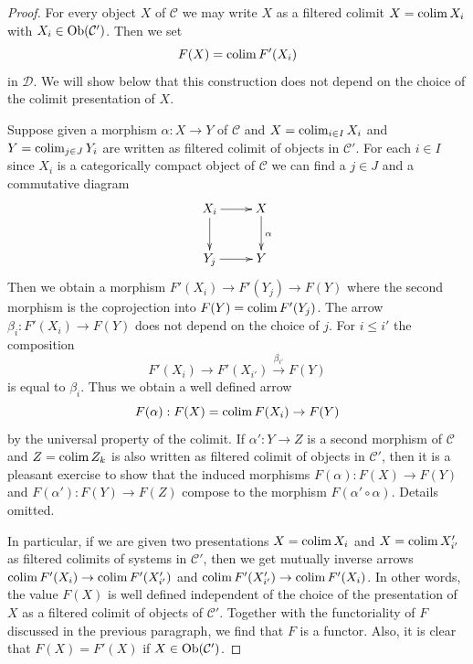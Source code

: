 \begin{proof}
For every object $X$ of $\mathcal{C}$ we may write $X$ as a filtered
colimit $X = \mathop{\mathrm{colim}}\nolimits X_i$ with $X_i \in \mathop{\mathrm{Ob}}\nolimits(\mathcal{C}')$. Then we set
$$
F(X) = \mathop{\mathrm{colim}}\nolimits F'(X_i)
$$
in $\mathcal{D}$. We will show below that this construction does not
depend on the choice of the colimit presentation of $X$.

\medskip\noindent
Suppose given a morphism $\alpha : X \to Y$ of $\mathcal{C}$
and $X = \mathop{\mathrm{colim}}\nolimits_{i \in I} X_i$ and $Y = \mathop{\mathrm{colim}}\nolimits_{j \in J} Y_i$
are written as filtered colimit of objects in $\mathcal{C}'$.
For each $i \in I$ since $X_i$ is a categorically compact object of
$\mathcal{C}$ we can find a $j \in J$ and a commutative diagram
$$
\xymatrix{
X_i \ar[r] \ar[d] & X \ar[d]^\alpha \\
Y_j \ar[r] & Y
}
$$
Then we obtain a morphism $F'(X_i) \to F'(Y_j) \to F(Y)$ where the second
morphism is the coprojection into $F(Y) = \mathop{\mathrm{colim}}\nolimits F'(Y_j)$. The arrow
$\beta_i : F'(X_i) \to F(Y)$ does not depend on the choice of $j$.
For $i \leq i'$ the composition
$$
F'(X_i) \to F'(X_{i'}) \xrightarrow{\beta_{i'}} F(Y)
$$
is equal to $\beta_i$. Thus we obtain a well defined arrow
$$
F(\alpha) : F(X) = \mathop{\mathrm{colim}}\nolimits F(X_i) \to F(Y)
$$
by the universal property of the colimit. If $\alpha' : Y \to Z$ is a
second morphism of $\mathcal{C}$ and $Z = \mathop{\mathrm{colim}}\nolimits Z_k$ is also
written as filtered colimit of objects in $\mathcal{C}'$, then
it is a pleasant exercise to show that the induced
morphisms $F(\alpha) : F(X) \to F(Y)$ and $F(\alpha') : F(Y) \to F(Z)$
compose to the morphism $F(\alpha' \circ \alpha)$. Details omitted.

\medskip\noindent
In particular, if we are given two presentations
$X = \mathop{\mathrm{colim}}\nolimits X_i$ and $X = \mathop{\mathrm{colim}}\nolimits X'_{i'}$ as filtered
colimits of systems in $\mathcal{C}'$, then we get mutually inverse
arrows $\mathop{\mathrm{colim}}\nolimits F'(X_i) \to \mathop{\mathrm{colim}}\nolimits F'(X'_{i'})$ and
$\mathop{\mathrm{colim}}\nolimits F'(X'_{i'}) \to \mathop{\mathrm{colim}}\nolimits F'(X_i)$. In other words, the
value $F(X)$ is well defined independent of the choice of the
presentation of $X$ as a filtered colimit of objects of $\mathcal{C}'$.
Together with the functoriality of $F$ discussed in the previous
paragraph, we find that $F$ is a functor. Also, it is clear that
$F(X) = F'(X)$ if $X \in \mathop{\mathrm{Ob}}\nolimits(\mathcal{C}')$.


\end{proof}
